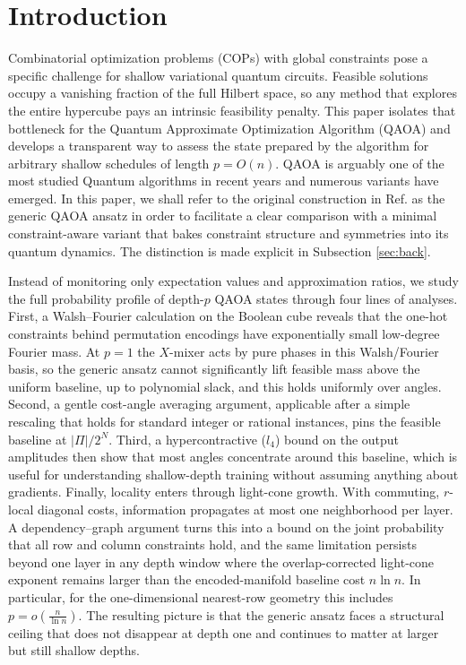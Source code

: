 \documentclass[a4paper,onecolumn,11pt,unpublished]{quantumarticle}
\theoremstyle{remark}
\begin{document}
\section{Introduction}
\label{sec:introduction}

Combinatorial optimization problems (COPs) with global constraints pose a specific challenge for shallow variational quantum circuits. Feasible solutions occupy a vanishing fraction of the full Hilbert space, so any method that explores the entire hypercube pays an intrinsic feasibility penalty. This paper isolates that bottleneck for the Quantum Approximate Optimization Algorithm (QAOA)\cite{Farhi2014QAOA} and develops a transparent way to assess the state prepared by the algorithm for arbitrary shallow schedules of length $p = O(n)$. QAOA is arguably one of the most studied Quantum algorithms in recent years and numerous variants have emerged. In this paper, we shall refer to the original construction in Ref. \cite{Farhi2014QAOA} as  the generic QAOA ansatz in order to facilitate a clear comparison with a minimal constraint-aware variant that bakes constraint structure and symmetries into its quantum dynamics. The distinction is made explicit in Subsection \ref{sec:back}.

\medskip
\noindent
Instead of monitoring only expectation values and approximation ratios, we study the full probability profile of depth-\(p\) QAOA states through four lines of analyses. First, a Walsh–Fourier calculation on the Boolean cube reveals that the one-hot constraints behind permutation encodings have exponentially small low-degree Fourier mass. At \(p=1\) the \(X\)-mixer acts by pure phases in this Walsh/Fourier basis, so the generic ansatz cannot significantly lift feasible mass above the uniform baseline, up to polynomial slack, and this holds uniformly over angles. Second, a gentle cost-angle averaging argument, applicable after a simple rescaling that holds for standard integer or rational instances, pins the feasible baseline at \(|\Pi|/2^N\). Third, a hypercontractive ($l_4$) bound on the output amplitudes then show that most angles concentrate around this baseline, which is useful for understanding shallow-depth training without assuming anything about gradients. Finally, locality enters through light-cone growth. With commuting, \(r\)-local diagonal costs, information propagates at most one neighborhood per layer. A dependency–graph argument turns this into a bound on the joint probability that all row and column constraints hold, and the same limitation persists beyond one layer in any depth window where the overlap-corrected light-cone exponent remains larger than the
encoded-manifold baseline cost \(n\ln n\).  In particular, for the
one-dimensional nearest-row geometry this includes \(
  p=o\!\left(\frac{n}{\ln n}\right).\) The resulting picture is that the generic ansatz faces a structural ceiling that does not disappear at depth one and continues to matter at larger but still shallow depths.
\end{document}

